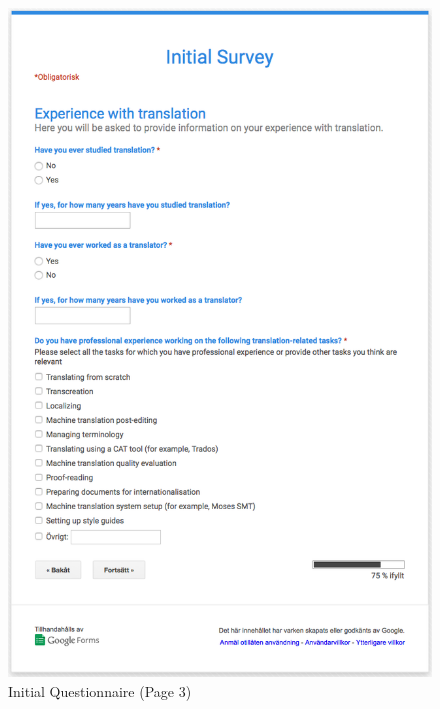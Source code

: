 \begin{figure}[H]
\myfloatalign
\includegraphics[width=\textwidth]{img/initial_questionnaire/initial_3.png}
\caption{Initial Questionnaire (Page 3)}
\end{figure}

